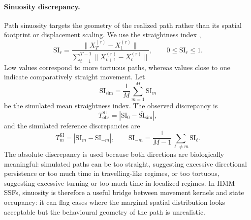\documentclass[11pt]{article}
\begin{document}
\paragraph{Sinuosity discrepancy.}
Path sinuosity targets the geometry of the realized path rather than its
spatial footprint or displacement scaling. We use the straightness index
\citep{benhamou2004},
\begin{equation*}
  \mathrm{SI}_r
  =
  \frac{\|X_T^{(r)}-X_1^{(r)}\|}
  {\sum_{t=1}^{T-1}\|X_{t+1}^{(r)}-X_t^{(r)}\|},
  \qquad 0 \le \mathrm{SI}_r \le 1.
\end{equation*}
Low values correspond to more tortuous paths, whereas values close to one
indicate comparatively straight movement. Let
\[
  \overline{\mathrm{SI}}_{\mathrm{sim}}
  =
  \frac{1}{M}\sum_{m=1}^{M}\mathrm{SI}_m
\]
be the simulated mean straightness index. The observed discrepancy is
\begin{equation*}
  T_{\mathrm{obs}}^{\mathrm{SI}}
  =
  \left|
    \mathrm{SI}_0
    -
    \overline{\mathrm{SI}}_{\mathrm{sim}}
  \right|,
\end{equation*}
and the simulated reference discrepancies are
\begin{equation*}
  T_m^{\mathrm{SI}}
  =
  \left|
    \mathrm{SI}_m
    -
    \overline{\mathrm{SI}}_{-m}
  \right|,
  \qquad
  \overline{\mathrm{SI}}_{-m}
  =
  \frac{1}{M-1}\sum_{\ell \ne m}\mathrm{SI}_{\ell}.
\end{equation*}
The absolute discrepancy is used because both directions are biologically
meaningful: simulated paths can be too straight, suggesting excessive
directional persistence or too much time in travelling-like regimes, or too
tortuous, suggesting excessive turning or too much time in localized regimes.
In HMM-SSFs, sinuosity is therefore a useful bridge between movement kernels
and state occupancy: it can flag cases where the marginal spatial distribution
looks acceptable but the behavioural geometry of the path is unrealistic.
\end{document}
